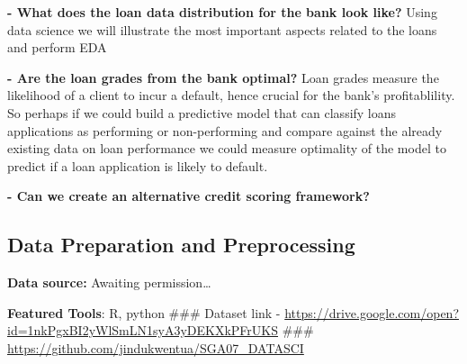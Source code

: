 \documentclass[
]{article}
\begin{document}
\textbf{- What does the loan data distribution for the bank look like?}
Using data science we will illustrate the most important aspects related
to the loans and perform EDA

\textbf{- Are the loan grades from the bank optimal?} Loan grades
measure the likelihood of a client to incur a default, hence crucial for
the bank's profitablility. So perhaps if we could build a predictive
model that can classify loans applications as performing or
non-performing and compare against the already existing data on loan
performance we could measure optimality of the model to predict if a
loan application is likely to default.

\textbf{- Can we create an alternative credit scoring framework?}

\hypertarget{data-preparation-and-preprocessing}{%
\subsection{Data Preparation and
Preprocessing}\label{data-preparation-and-preprocessing}}

\textbf{Data source:} Awaiting permission\ldots{}

\textbf{Featured Tools}: R, python \#\#\# Dataset link -
\url{https://drive.google.com/open?id=1nkPgxBI2yWlSmLN1syA3yDEKXkPFrUKS}
\#\#\# \url{https://github.com/jindukwentua/SGA07_DATASCI}
\end{document}
